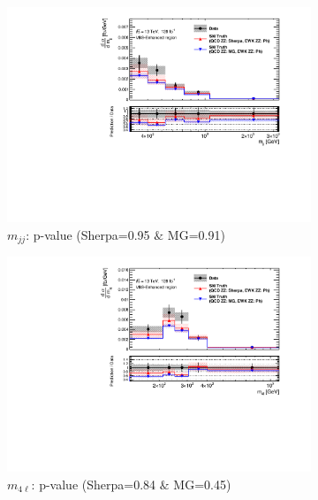 \begin{figure}[!htbp]
    \centering
    \begin{subfigure}{.49\textwidth}
        \centering
        \includegraphics[width=.98\linewidth]{figures/Results/CrossSection_VBSEnhanced/xs_mjj_SR.pdf}
        \caption{ \footnotesize{$m_{jj}$: p-value (Sherpa=0.95 $\&$ MG=0.91)}}
    \end{subfigure}
    \begin{subfigure}{.49\textwidth}
        \centering
        \includegraphics[width=.98\linewidth]{figures/Results/CrossSection_VBSEnhanced/xs_m4l_SR.pdf}
        \caption{ \footnotesize{$m_{4\ell}$: p-value (Sherpa=0.84 $\&$ MG=0.45)} }
    \end{subfigure}\\
    \begin{subfigure}{.49\textwidth}

\end{subfigure}
\end{figure}
